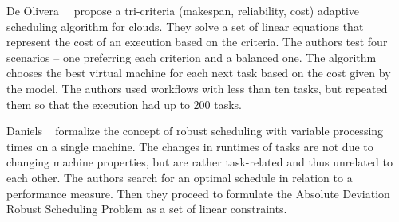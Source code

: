 \documentclass[conference]{IEEEtran}
\begin{document}
%
%
%

    De Olivera~\etal~\cite{de2012provenance} propose a tri-criteria (makespan, reliability, cost) adaptive scheduling algorithm
    for clouds.
    They solve a set of linear equations that represent the cost of an execution based on the criteria.
    The authors test four scenarios -- one preferring each criterion and a balanced one.
    The algorithm chooses the best virtual machine for each next task based on the cost given by the model.
    The authors used workflows with less than ten tasks, but repeated them so that the execution had up to 200 tasks.


    Daniels \etal~\cite{daniels1995robust} formalize the concept of robust scheduling with variable processing times
    on a single machine.
    The changes in runtimes of tasks are not due to changing machine properties, but are rather task-related
    and thus unrelated to each other.
    The authors search for an optimal schedule
    in relation to a performance measure. %
    Then they proceed to formulate the Absolute Deviation Robust Scheduling Problem as a set of linear constraints.
\end{document}
